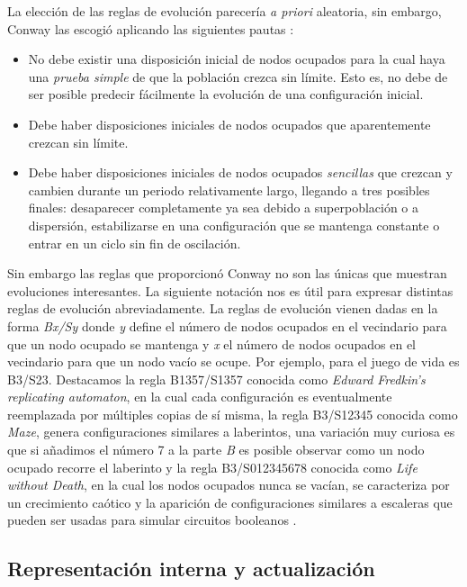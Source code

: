\documentclass[../proyecto.tex]{memoir}
\begin{document}
La elección de las reglas de evolución parecería \textit{a priori} aleatoria, sin embargo, Conway las escogió aplicando las siguientes pautas \cite{libroGardner}:
\begin{itemize}
	\item No debe existir una disposición inicial de nodos ocupados para la cual haya una \textit{prueba simple} de que la población crezca sin límite. Esto es, no debe de ser posible predecir fácilmente la evolución de una configuración inicial.
	\item Debe haber disposiciones iniciales de nodos ocupados que aparentemente crezcan sin límite. 
	\item Debe haber disposiciones iniciales de nodos ocupados \textit{sencillas} que crezcan y cambien durante un periodo relativamente largo, llegando a tres posibles finales: desaparecer completamente ya sea debido a superpoblación o a dispersión, estabilizarse en una configuración que se mantenga constante o entrar en un ciclo sin fin de oscilación.
\end{itemize}

Sin embargo las reglas que proporcionó Conway no son las únicas que muestran evoluciones interesantes. La siguiente notación nos es útil para expresar distintas reglas de evolución abreviadamente. La reglas de evolución vienen dadas en la forma \textit{Bx/Sy} donde \textit{y} define el número de nodos ocupados en el vecindario para que un nodo ocupado se mantenga y \textit{x} el número de nodos ocupados en el vecindario para que un nodo vacío se ocupe. Por ejemplo, para el juego de vida es B3/S23. Destacamos la regla B1357/S1357 conocida como \textit{Edward Fredkin's replicating automaton}, en la cual cada configuración es eventualmente reemplazada por múltiples copias de sí misma, la regla B3/S12345 conocida como \textit{Maze}, genera configuraciones similares a laberintos, una variación muy curiosa es que si añadimos el número 7 a la parte \textit{B} es posible observar como un nodo ocupado recorre el laberinto y la regla B3/S012345678 conocida como \textit{Life without Death}, en la cual los nodos ocupados nunca se vacían, se caracteriza por un crecimiento caótico y la aparición de configuraciones similares a escaleras que pueden ser usadas para simular circuitos booleanos \cite{regla1}.


\subsection{Representación interna y actualización} \label{celulitas}
\end{document}
